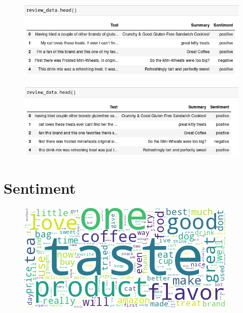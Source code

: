 \documentclass{beamer}
\begin{document}
\begin{frame}
    \begin{figure}
        \includegraphics[width=\textwidth]{../figures/pre_before.png}
    \end{figure}
    \begin{figure}
        \includegraphics[width=\textwidth]{../figures/pre_after.png}
    \end{figure}
\end{frame}

\section{Sentiment}

\begin{frame}
    \begin{figure}
        \includegraphics[width=.6\textwidth]{../figures/sent_wordcloud.png}
    \end{figure}
\end{frame}
\end{document}
